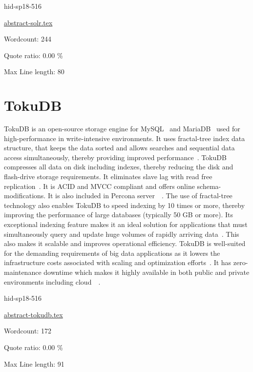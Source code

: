 \begin{IU}

hid-sp18-516

\href{https://github.com/cloudmesh-community/hid-sp18-516/blob/master//technology/abstract-solr.tex}{abstract-solr.tex}

 

Wordcount: 244


Quote ratio: 0.00 \%
 
Max Line length: 80
\end{IU}

\section{TokuDB}

TokuDB is an open-source storage engine for 
MySQL~\cite{hid-sp18-516-www-wiki-mysql} and 
MariaDB~\cite{hid-sp18-516-www-wiki-mariadb} used for high-performance in 
write-intensive environments. It uses fractal-tree index data structure, 
that keeps the data sorted and allows searches and sequential data access 
simultaneously, thereby providing improved 
performance~\cite{hid-sp18-516-www-wiki-tokudb}. TokuDB compresses all data 
on disk including indexes, thereby reducing the disk and flash-drive storage 
requirements. It eliminates slave lag with read free 
replication~\cite{hid-sp18-516-www-percona-server-tokudb}. It is ACID and MVCC
compliant and offers online schema-modifications. It is also included in
Percona 
server~\cite{hid-sp18-516-www-percona-tokudb}~\cite{hid-sp18-516-www-wiki-tokudb}. 
The use of fractal-tree technology also enables TokuDB to speed indexing by 10 
times or more, thereby improving the performance of large databases (typically 
50 GB or more). Its exceptional indexing feature makes it an ideal solution for 
applications that must simultaneously query and update huge volumes of rapidly 
arriving data~\cite{hid-sp18-516-www-blackbird-si}. This also makes it scalable 
and improves operational efficiency. TokuDB is well-suited for the demanding
requirements of big data applications as it lowers the infrastructure costs
associated with scaling and optimization
efforts~\cite{hid-sp18-516-www-percona-tokudb}. It has zero-maintenance downtime
which makes it highly available in both public and private environments
including
cloud~\cite{hid-sp18-516-www-percona-server-tokudb}~\cite{hid-sp18-516-www-percona-tokudb}.


\begin{IU}

hid-sp18-516

\href{https://github.com/cloudmesh-community/hid-sp18-516/blob/master//technology/abstract-tokudb.tex}{abstract-tokudb.tex}

 

Wordcount: 172


Quote ratio: 0.00 \%
 
Max Line length: 91
\end{IU}

